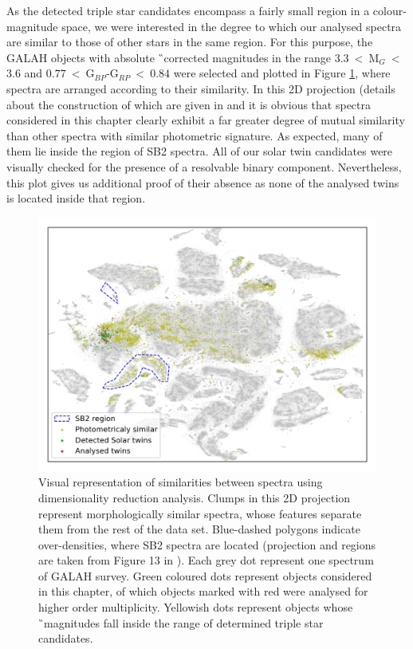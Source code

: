 As the detected triple star candidates encompass a fairly small region in a colour-magnitude space, we were interested in the degree to which our analysed spectra are similar to those of other stars in the same region. For this purpose, the GALAH objects with absolute \G\ corrected magnitudes in the range $3.3$~<~M$_{G}$~<~$3.6$ and $0.77$~<~G$_{BP}$-G$_{RP}$~<~$0.84$ were selected and plotted in Figure \ref{fig:tsne_marked}, where spectra are arranged according to their similarity. In this 2D projection (details about the construction of which are given in \citet{2017ApJS..228...24T} and \citet{buder2018} it is obvious that spectra considered in this chapter clearly exhibit a far greater degree of mutual similarity than other spectra with similar photometric signature. As expected, many of them lie inside the region of SB2 spectra. All of our solar twin candidates were visually checked for the presence of a resolvable binary component. Nevertheless, this plot gives us additional proof of their absence as none of the analysed twins is located inside that region.

\begin{figure}
	\centering
	\includegraphics[width=\textwidth]{evaluated_all_tsne.png}
	\caption{Visual representation of similarities between spectra using dimensionality reduction analysis. Clumps in this 2D projection represent morphologically similar spectra, whose features separate them from the rest of the data set. Blue-dashed polygons indicate over-densities, where SB2 spectra are located (projection and regions are taken from Figure 13 in \citet{buder2018}). Each grey dot represent one spectrum of GALAH survey. Green coloured dots represent objects considered in this chapter, of which objects marked with red were analysed for higher order multiplicity. Yellowish dots represent objects whose \G\ magnitudes fall inside the range of determined triple star candidates.}
	\label{fig:tsne_marked}
\end{figure}

